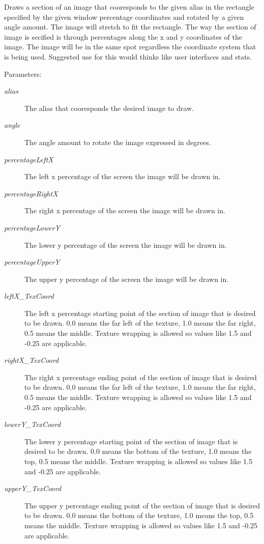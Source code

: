 Draws a section of an image that cooresponds to the given alias in the rectangle specified by the given window percentage coordinates and rotated by a given angle amount. The image will stretch to fit the rectangle. The way the section of image is secified is through percentages along the x and y coordinates of the image. The image will be in the same spot regardless the coordinate system that is being used. Suggested use for this would thinks like user interfaces and stats. \begin{Desc}
\item[Parameters:]
\begin{description}
\item[{\em alias}]The alias that cooresponds the desired image to draw. \item[{\em angle}]The angle amount to rotate the image expressed in degrees. \item[{\em percentageLeftX}]The left x percentage of the screen the image will be drawn in. \item[{\em percentageRightX}]The right x percentage of the screen the image will be drawn in. \item[{\em percentageLowerY}]The lower y percentage of the screen the image will be drawn in. \item[{\em percentageUpperY}]The upper y percentage of the screen the image will be drawn in. \item[{\em leftX\_\-TexCoord}]The left x percentage starting point of the section of image that is desired to be drawn. 0.0 means the far left of the texture, 1.0 means the far right, 0.5 means the middle. Texture wrapping is allowed so values like 1.5 and -0.25 are applicable. \item[{\em rightX\_\-TexCoord}]The right x percentage ending point of the section of image that is desired to be drawn. 0.0 means the far left of the texture, 1.0 means the far right, 0.5 means the middle. Texture wrapping is allowed so values like 1.5 and -0.25 are applicable. \item[{\em lowerY\_\-TexCoord}]The lower y percentage starting point of the section of image that is desired to be drawn. 0.0 means the bottom of the texture, 1.0 means the top, 0.5 means the middle. Texture wrapping is allowed so values like 1.5 and -0.25 are applicable. \item[{\em upperY\_\-TexCoord}]The upper y percentage ending point of the section of image that is desired to be drawn. 0.0 means the bottom of the texture, 1.0 means the top, 0.5 means the middle. Texture wrapping is allowed so values like 1.5 and -0.25 are applicable. \end{description}
\end{Desc}
